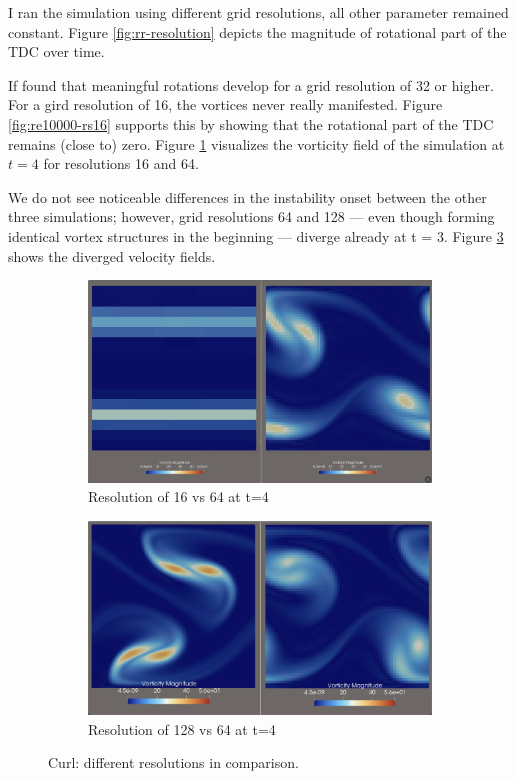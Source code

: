 \documentclass[a4paper,12pt]{article}
\begin{document}
I ran the simulation using different grid resolutions, all other parameter remained constant.
Figure \ref{fig:rr-resolution} depicts the magnitude of rotational part of the \ac{TDC} over time.

If found that meaningful rotations develop for a grid resolution of 32 or higher.
For a gird resolution of 16, the vortices never really manifested. Figure \ref{fig:re10000-rs16} supports this by showing that the rotational part of the \ac{TDC} remains (close to) zero. Figure \ref{fig:re16vs64} visualizes the vorticity field of the simulation at $t=4$ for resolutions 16 and 64.

We do not see noticeable differences in the instability onset between the other three simulations; however, grid resolutions 64 and 128 --- even though forming identical vortex structures in the beginning --- diverge already at t = 3. Figure \ref{fig:re128vs64} shows the diverged velocity fields.

\begin{figure}
     \centering
     \begin{subfigure}[b]{0.45\textwidth}
         \centering
         \includegraphics[width=\textwidth]{imgs/re16vs64}
         \caption{Resolution of 16 vs 64 at t=4}
         \label{fig:re16vs64}
     \end{subfigure}
     \hfill
     \begin{subfigure}[b]{0.45\textwidth}
         \centering
         \includegraphics[width=\textwidth]{imgs/re128vs64}
         \caption{Resolution of 128 vs 64 at t=4}
         \label{fig:re128vs64}
     \end{subfigure}
     \caption{Curl: different resolutions in comparison.}
\end{figure}
\end{document}
